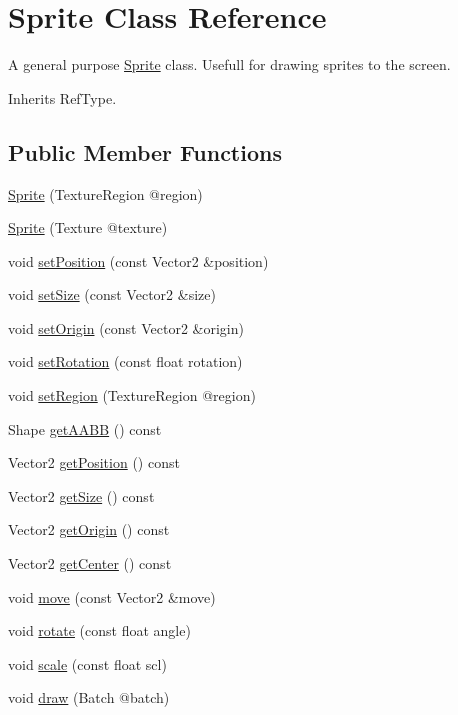 \hypertarget{class_sprite}{\section{Sprite Class Reference}
\label{class_sprite}
}


A general purpose \hyperlink{class_sprite}{Sprite} class. Usefull for drawing sprites to the screen.  




Inherits Ref\+Type.

\subsection*{Public Member Functions}
\begin{DoxyCompactItemize}
\item 
\hyperlink{class_sprite_a29de4e0fc43c90ee54630f821fae3f6d}{Sprite} (Texture\+Region @region)
\item 
\hyperlink{class_sprite_a1b68b64346a1c99280740e825de21ec8}{Sprite} (Texture @texture)
\item 
void \hyperlink{class_sprite_a5c42a8a652adfd7a2185229dfa8a2f99}{set\+Position} (const Vector2 \&position)
\item 
void \hyperlink{class_sprite_a33fe51395aa3d372a16ccda8df5c7b12}{set\+Size} (const Vector2 \&size)
\item 
void \hyperlink{class_sprite_a56199a8edb085342da44857635ec091a}{set\+Origin} (const Vector2 \&origin)
\item 
void \hyperlink{class_sprite_aad424b86963bde58e6f62074c4b2c037}{set\+Rotation} (const float rotation)
\item 
void \hyperlink{class_sprite_a8605a40678e4454062a6e4be6069d99f}{set\+Region} (Texture\+Region @region)
\item 
Shape \hyperlink{class_sprite_aa303c8d552308024a59159da86603fa1}{get\+A\+A\+B\+B} () const 
\item 
Vector2 \hyperlink{class_sprite_ab02f4333185e9ecd2830266cce22004d}{get\+Position} () const 
\item 
Vector2 \hyperlink{class_sprite_a1db7848ab8886b382e56889c2a0195a4}{get\+Size} () const 
\item 
Vector2 \hyperlink{class_sprite_ac7e4e3b1670311a87c63d5424ec27ea5}{get\+Origin} () const 
\item 
Vector2 \hyperlink{class_sprite_a209c829098440c836e4fb10f41bb0aea}{get\+Center} () const 
\item 
void \hyperlink{class_sprite_a8b25650441ad72d3c449494607d8dbda}{move} (const Vector2 \&move)
\item 
void \hyperlink{class_sprite_a157bcaff0e3fb4f62ed9ad139a27b0ad}{rotate} (const float angle)
\item 
void \hyperlink{class_sprite_a6400777edb313463aac0a4b60dd1e011}{scale} (const float scl)
\item 
void \hyperlink{class_sprite_a5273752c722df11cbf6f61d7ef9e18bb}{draw} (Batch @batch)
\end{DoxyCompactItemize}


